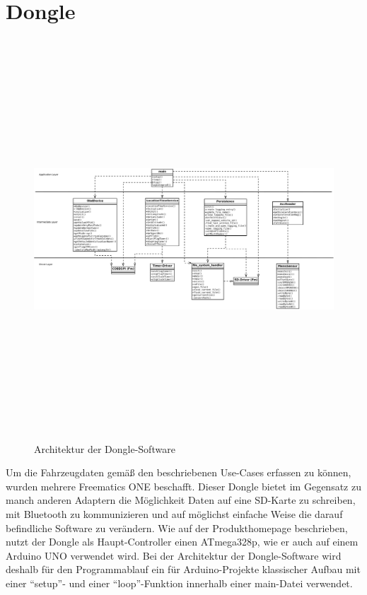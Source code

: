 \section{Dongle}
\begin{figure}
  \begin{center}
    \includegraphics[width=\textwidth,height=15cm,keepaspectratio]{./img/Dongle_Arch_final}
    \caption{Architektur der Dongle-Software}
    \label{fig:dongleArch}
  \end{center}
\end{figure}
Um die Fahrzeugdaten gemäß den beschriebenen Use-Cases erfassen zu können, wurden mehrere Freematics ONE beschafft. Dieser Dongle bietet im Gegensatz zu manch anderen Adaptern die Möglichkeit Daten auf eine SD-Karte zu schreiben, mit Bluetooth zu kommunizieren und auf möglichst einfache Weise die darauf befindliche Software zu verändern. Wie auf der Produkthomepage\cite{Ltd2014} beschrieben, nutzt der Dongle als Haupt-Controller einen ATmega328p, wie er auch auf einem Arduino UNO verwendet wird. Bei der Architektur der Dongle-Software wird deshalb für den Programmablauf ein für Arduino-Projekte klassischer Aufbau mit einer \enquote{setup}- und einer \enquote{loop}-Funktion innerhalb einer main-Datei verwendet.
